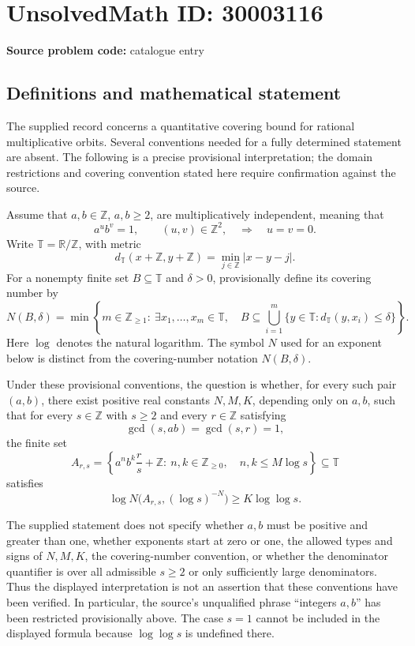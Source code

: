 \documentclass[11pt]{article}
\newcommand{\Z}{\mathbb{Z}}
\newcommand{\R}{\mathbb{R}}
\begin{document}
\section*{UnsolvedMath ID: 30003116}
\textbf{Source problem code:} catalogue entry
\subsection{Definitions and mathematical statement}
The supplied record concerns a quantitative covering bound for rational multiplicative orbits. Several conventions needed for a fully determined statement are absent. The following is a precise provisional interpretation; the domain restrictions and covering convention stated here require confirmation against the source.

Assume that \(a,b\in\Z\), \(a,b\geq2\), are multiplicatively independent, meaning that
\[
 a^u b^v=1,\qquad (u,v)\in\Z^2,
 \quad\Longrightarrow\quad u=v=0.
\]
Write \(\mathbb T=\R/\Z\), with metric
\[
 d_{\mathbb T}(x+\Z,y+\Z)=\min_{j\in\Z}|x-y-j|.
\]
For a nonempty finite set \(B\subseteq\mathbb T\) and \(\delta>0\), provisionally define its covering number by
\[
 N(B,\delta)=\min\left\{m\in\Z_{\geq1}:\ \exists x_1,\ldots,x_m\in\mathbb T,\quad
 B\subseteq\bigcup_{i=1}^{m}\{y\in\mathbb T:d_{\mathbb T}(y,x_i)\leq\delta\}\right\}.
\]
Here \(\log\) denotes the natural logarithm. The symbol \(N\) used for an exponent below is distinct from the covering-number notation \(N(B,\delta)\).

Under these provisional conventions, the question is whether, for every such pair \((a,b)\), there exist positive real constants \(N,M,K\), depending only on \(a,b\), such that for every \(s\in\Z\) with \(s\geq2\) and every \(r\in\Z\) satisfying
\[
 \gcd(s,ab)=\gcd(s,r)=1,
\]
the finite set
\[
 A_{r,s}=\left\{a^n b^k\frac{r}{s}+\Z:\ n,k\in\Z_{\geq0},\quad n,k\leq M\log s\right\}\subseteq\mathbb T
\]
satisfies
\[
 \log N\bigl(A_{r,s},(\log s)^{-N}\bigr)\geq K\log\log s.
\]

The supplied statement does not specify whether \(a,b\) must be positive and greater than one, whether exponents start at zero or one, the allowed types and signs of \(N,M,K\), the covering-number convention, or whether the denominator quantifier is over all admissible \(s\geq2\) or only sufficiently large denominators. Thus the displayed interpretation is not an assertion that these conventions have been verified. In particular, the source's unqualified phrase ``integers \(a,b\)'' has been restricted provisionally above. The case \(s=1\) cannot be included in the displayed formula because \(\log\log s\) is undefined there.
\end{document}
